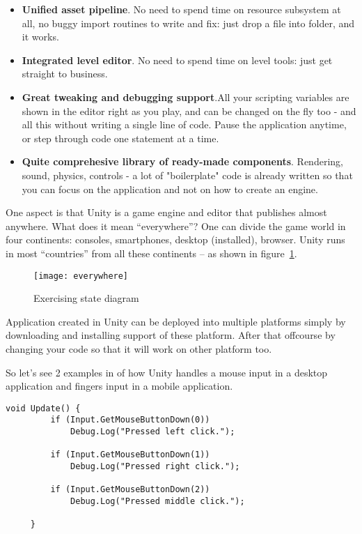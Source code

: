 \begin{itemize}
\item \textbf{Unified asset pipeline}. No need to spend time on resource subsystem at all, no buggy import routines to write and fix: just drop a file into folder, and it works.
\item \textbf{Integrated level editor}. No need to spend time on level tools: just get straight to business.

\item \textbf{Great tweaking and debugging support}.All your scripting variables are shown in the editor right as you play, and can be changed on the fly too - and all this without writing a single line of code. Pause the application anytime, or step through code one statement at a time.

\item \textbf{Quite comprehesive library of ready-made components}. Rendering, sound, physics, controls - a lot of "boilerplate" code is already written so that you can focus on the application and not on how to create an engine.
\end{itemize}

One aspect is that Unity is a game engine and editor that publishes almost anywhere. What does it mean “everywhere”? One can divide the game world in four continents: consoles, smartphones, desktop (installed), browser.  Unity runs in most “countries” from all these continents – as shown in \mbox{figure \ref{everywhere}}.
\begin{figure}[!h]
\centering
\texttt{[image: everywhere]}
\caption{Exercising state diagram \cite{multiplatform}}\label{everywhere}
\end{figure}

Application created in Unity can be deployed into multiple platforms simply by downloading and installing support of these platform. After that offcourse by changing your code so that it will work on other platform too.

So let's see 2 examples in of how Unity handles a mouse input in a desktop application and fingers input in a mobile application.
\begin{lstlisting}[caption={Mouse input for desktop application in Unity \cite{mousedown}.},label={mouseInput}]
 void Update() {
         if (Input.GetMouseButtonDown(0))
             Debug.Log("Pressed left click.");
         
         if (Input.GetMouseButtonDown(1))
             Debug.Log("Pressed right click.");
         
         if (Input.GetMouseButtonDown(2))
             Debug.Log("Pressed middle click.");
         
     }
\end{lstlisting}

